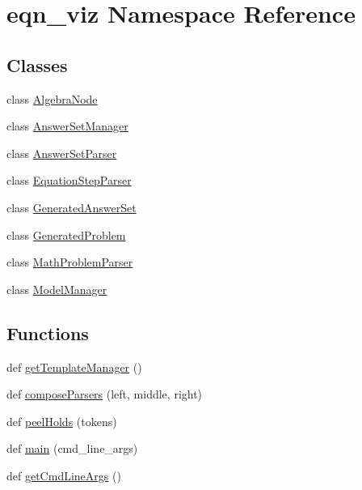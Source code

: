 \hypertarget{namespaceeqn__viz}{}\section{eqn\+\_\+viz Namespace Reference}
\label{namespaceeqn__viz}
\subsection*{Classes}
\begin{DoxyCompactItemize}
\item 
class \hyperlink{classeqn__viz_1_1_algebra_node}{Algebra\+Node}
\item 
class \hyperlink{classeqn__viz_1_1_answer_set_manager}{Answer\+Set\+Manager}
\item 
class \hyperlink{classeqn__viz_1_1_answer_set_parser}{Answer\+Set\+Parser}
\item 
class \hyperlink{classeqn__viz_1_1_equation_step_parser}{Equation\+Step\+Parser}
\item 
class \hyperlink{classeqn__viz_1_1_generated_answer_set}{Generated\+Answer\+Set}
\item 
class \hyperlink{classeqn__viz_1_1_generated_problem}{Generated\+Problem}
\item 
class \hyperlink{classeqn__viz_1_1_math_problem_parser}{Math\+Problem\+Parser}
\item 
class \hyperlink{classeqn__viz_1_1_model_manager}{Model\+Manager}
\end{DoxyCompactItemize}
\subsection*{Functions}
\begin{DoxyCompactItemize}
\item 
def \hyperlink{namespaceeqn__viz_a09faf0d0395a3e4f6075cce89ff0285d}{get\+Template\+Manager} ()
\item 
def \hyperlink{namespaceeqn__viz_a77840944e82440038b71417a8d7204b1}{compose\+Parsers} (left, middle, right)
\item 
def \hyperlink{namespaceeqn__viz_a993af6aa282c460f53ded3ad8c8b0b93}{peel\+Holds} (tokens)
\item 
def \hyperlink{namespaceeqn__viz_afb82e11030ed8435793bb5958189540d}{main} (cmd\+\_\+line\+\_\+args)
\item 
def \hyperlink{namespaceeqn__viz_a1ced7888f4e1050beff42555639b94ef}{get\+Cmd\+Line\+Args} ()
\end{DoxyCompactItemize}
